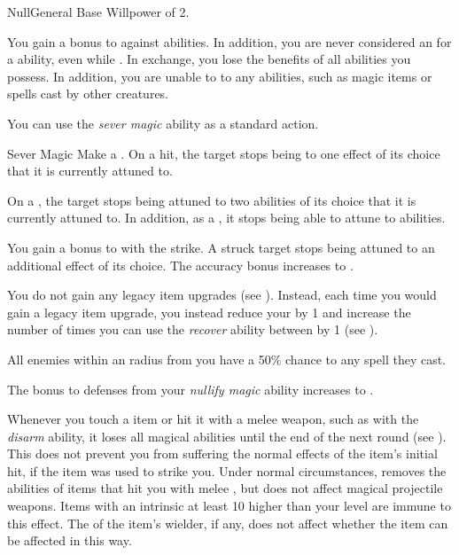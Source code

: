     \begin{feat}{Null}{General}
        \featpre Base Willpower of 2.

         You gain a  bonus to  against  abilities.
        In addition, you are never considered an  for a  ability, even while .
        In exchange, you lose the benefits of all  abilities you possess.
        In addition, you are unable to  to any  abilities, such as magic items or spells cast by other creatures.

         You can use the \textit{sever magic} ability as a standard action.
        \begin{freeability}{Sever Magic}
            Make a .
            On a hit, the target stops being  to one effect of its choice that it is currently attuned to.

            On a , the target stops being attuned to two abilities of its choice that it is currently attuned to.
            In addition, as a , it stops being able to attune to abilities.

            \rankline
             You gain a  bonus to  with the strike.
             A struck target stops being attuned to an additional effect of its choice.
             The accuracy bonus increases to .
        \end{freeability}

         You do not gain any legacy item upgrades (see ).
        Instead, each time you would gain a legacy item upgrade, you instead reduce your  by 1 and increase the number of times you can use the \textit{recover} ability between  by 1 (see ).

         All enemies within an \areamed radius from you have a 50\% chance to  any spell they cast.

         The bonus to defenses from your \textit{nullify magic} ability increases to .

         Whenever you touch a  item or hit it with a melee weapon, such as with the \textit{disarm} ability, it loses all magical abilities until the end of the next round (see ).
        This does not prevent you from suffering the normal effects of the item's initial hit, if the item was used to strike you.
        Under normal circumstances, removes the abilities of items that hit you with melee , but does not affect magical projectile weapons.
        Items with an intrinsic  at least 10 higher than your level are immune to this effect.
        The  of the item's wielder, if any, does not affect whether the item can be affected in this way.


\end{feat}
